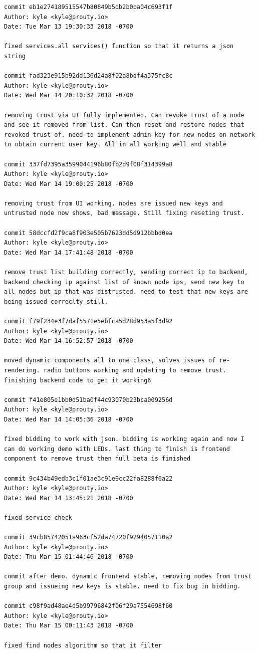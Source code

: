 \documentclass[draftclsnofoot, onecolumn, compsoc, 10pt]{IEEEtran}
\begin{document}
\begin{lstlisting}
commit eb1e274189515547b80849b5db2b0ba04c693f1f 
Author: kyle <kyle@prouty.io> 
Date: Tue Mar 13 19:30:33 2018 -0700 

fixed services.all services() function so that it returns a json string 

commit fad323e915b92dd136d24a8f02a8bdf4a375fc8c 
Author: kyle <kyle@prouty.io> 
Date: Wed Mar 14 20:10:32 2018 -0700 

removing trust via UI fully implemented. Can revoke trust of a node and see it removed from list. Can then reset and restore nodes that revoked trust of. need to implement admin key for new nodes on network to obtain current user key. All in all working well and stable 

commit 337fd7395a3599044196b80fb2d9f08f314399a8 
Author: kyle <kyle@prouty.io> 
Date: Wed Mar 14 19:00:25 2018 -0700 

removing trust from UI working. nodes are issued new keys and untrusted node now shows, bad message. Still fixing reseting trust. 

commit 58dccfd2f9ca8f903e505b7623dd5d912bbbd0ea 
Author: kyle <kyle@prouty.io> 
Date: Wed Mar 14 17:41:48 2018 -0700 

remove trust list building correctly, sending correct ip to backend, backend checking ip against list of known node ips, send new key to all nodes but ip that was distrusted. need to test that new keys are being issued correclty still. 

commit f79f234e3f7daf5571e5ebfca5d28d953a5f3d92 
Author: kyle <kyle@prouty.io> 
Date: Wed Mar 14 16:52:57 2018 -0700 

moved dynamic components all to one class, solves issues of re-rendering. radio buttons working and updating to remove trust. finishing backend code to get it working6 

commit f41e805e1bb0d51ba0f44c93070b23bca009256d 
Author: kyle <kyle@prouty.io> 
Date: Wed Mar 14 14:05:36 2018 -0700 

fixed bidding to work with json. bidding is working again and now I can do working demo with LEDs. last thing to finish is frontend component to remove trust then full beta is finished 

commit 9c434b49edb3c1f01ae3c91e9cc22fa8288f6a22 
Author: kyle <kyle@prouty.io> 
Date: Wed Mar 14 13:45:21 2018 -0700 

fixed service check 

commit 39cb85742051a963cf52da74720f9294057110a2 
Author: kyle <kyle@prouty.io> 
Date: Thu Mar 15 01:44:46 2018 -0700 

commit after demo. dynamic frontend stable, removing nodes from trust group and issueing new keys is stable. need to fix bug in bidding. 

commit c98f9ad48ae4d5b99796842f06f29a7554698f60 
Author: kyle <kyle@prouty.io> 
Date: Thu Mar 15 00:11:43 2018 -0700 

fixed find nodes algorithm so that it filter 
\end{lstlisting}
\end{document}
